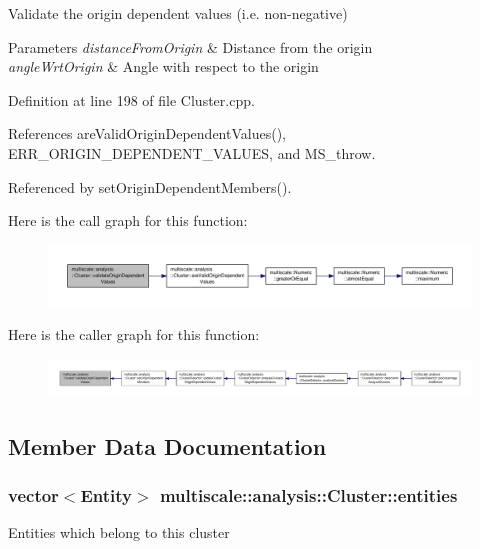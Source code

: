 Validate the origin dependent values (i.\-e. non-\/negative) 


\begin{DoxyParams}{Parameters}
{\em distance\-From\-Origin} & Distance from the origin \\
\hline
{\em angle\-Wrt\-Origin} & Angle with respect to the origin \\
\hline
\end{DoxyParams}


Definition at line 198 of file Cluster.\-cpp.



References are\-Valid\-Origin\-Dependent\-Values(), E\-R\-R\-\_\-\-O\-R\-I\-G\-I\-N\-\_\-\-D\-E\-P\-E\-N\-D\-E\-N\-T\-\_\-\-V\-A\-L\-U\-E\-S, and M\-S\-\_\-throw.



Referenced by set\-Origin\-Dependent\-Members().



Here is the call graph for this function\-:
\nopagebreak
\begin{figure}[H]
\begin{center}
\leavevmode
\includegraphics[width=350pt]{classmultiscale_1_1analysis_1_1Cluster_a26b9c11e63bfdbfc837a35f68c5c40dd_cgraph}
\end{center}
\end{figure}




Here is the caller graph for this function\-:
\nopagebreak
\begin{figure}[H]
\begin{center}
\leavevmode
\includegraphics[width=350pt]{classmultiscale_1_1analysis_1_1Cluster_a26b9c11e63bfdbfc837a35f68c5c40dd_icgraph}
\end{center}
\end{figure}




\subsection{Member Data Documentation}
\hypertarget{classmultiscale_1_1analysis_1_1Cluster_a820298479651328fb79d92a65f7923d6}{
\subsubsection[{entities}]{\setlength{\rightskip}{0pt plus 5cm}vector$<${\bf Entity}$>$ multiscale\-::analysis\-::\-Cluster\-::entities\hspace{0.3cm}{\ttfamily [private]}}}\label{classmultiscale_1_1analysis_1_1Cluster_a820298479651328fb79d92a65f7923d6}
Entities which belong to this cluster 


